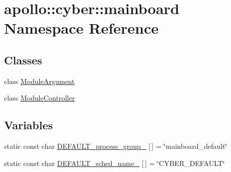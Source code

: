 \hypertarget{namespaceapollo_1_1cyber_1_1mainboard}{\section{apollo\-:\-:cyber\-:\-:mainboard Namespace Reference}
\label{namespaceapollo_1_1cyber_1_1mainboard}
}
\subsection*{Classes}
\begin{DoxyCompactItemize}
\item 
class \hyperlink{classapollo_1_1cyber_1_1mainboard_1_1ModuleArgument}{Module\-Argument}
\item 
class \hyperlink{classapollo_1_1cyber_1_1mainboard_1_1ModuleController}{Module\-Controller}
\end{DoxyCompactItemize}
\subsection*{Variables}
\begin{DoxyCompactItemize}
\item 
static const char \hyperlink{namespaceapollo_1_1cyber_1_1mainboard_a953f8345cac87c72141392b3ae55cfb9}{D\-E\-F\-A\-U\-L\-T\-\_\-process\-\_\-group\-\_\-} \mbox{[}$\,$\mbox{]} = \char`\"{}mainboard\-\_\-default\char`\"{}
\item 
static const char \hyperlink{namespaceapollo_1_1cyber_1_1mainboard_a04b8b5349b0c0d0d8d5a6c16a7e06ebf}{D\-E\-F\-A\-U\-L\-T\-\_\-sched\-\_\-name\-\_\-} \mbox{[}$\,$\mbox{]} = \char`\"{}C\-Y\-B\-E\-R\-\_\-\-D\-E\-F\-A\-U\-L\-T\char`\"{}
\end{DoxyCompactItemize}


